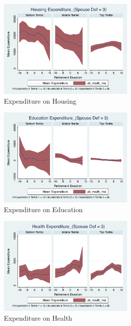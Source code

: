 \documentclass[11pt]{article}
\begin{document}
\clearpage

\begin{figure}[h]
	\caption{Expenditure on Housing}
	\centering
	\includegraphics[width=0.6\textwidth]{../ConsumptionPostRetirement_by_SpouseDef_Cats/Smoothed/3/spouse_def_total_housing_real.pdf}
\end{figure}


\begin{figure}[h]
	\caption{Expenditure on Education}
	\centering
	\includegraphics[width=0.6\textwidth]{../ConsumptionPostRetirement_by_SpouseDef_Cats/Smoothed/3/spouse_def_total_education_real.pdf}
\end{figure}
\clearpage

\begin{figure}[h]
	\caption{Expenditure on Health}
	\centering
	\includegraphics[width=0.6\textwidth]{../ConsumptionPostRetirement_by_SpouseDef_Cats/Smoothed/3/spouse_def_total_healthexpense_real.pdf}
\end{figure}
\end{document}
